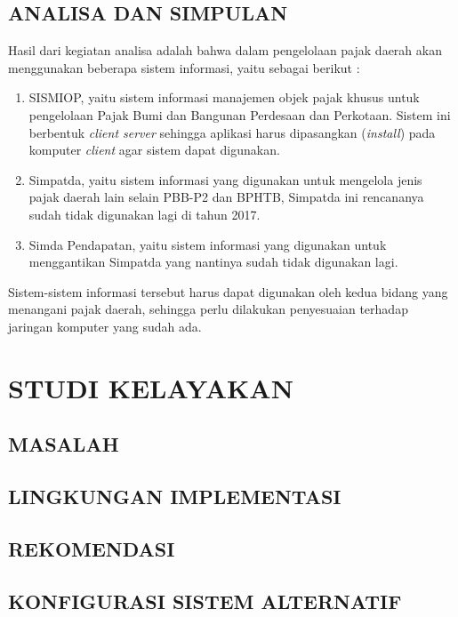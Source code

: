 \documentclass[pdftex,12pt, oneside]{article}
\begin{document}
\subsection{ANALISA DAN SIMPULAN}

Hasil dari kegiatan analisa adalah bahwa dalam pengelolaan pajak daerah akan menggunakan beberapa sistem informasi, yaitu sebagai berikut :

\begin{enumerate}[1.]
  \item SISMIOP, yaitu sistem informasi manajemen objek pajak khusus untuk pengelolaan Pajak Bumi dan Bangunan Perdesaan dan Perkotaan. Sistem ini berbentuk \textit{client server} sehingga aplikasi harus dipasangkan (\textit{install}) pada komputer \textit{client} agar sistem dapat digunakan.
  
  \item Simpatda, yaitu sistem informasi yang digunakan untuk mengelola jenis pajak daerah lain selain PBB-P2 dan BPHTB, Simpatda ini rencananya sudah tidak digunakan lagi di tahun 2017.
  
  \item Simda Pendapatan, yaitu sistem informasi yang digunakan untuk menggantikan Simpatda yang nantinya sudah tidak digunakan lagi.
\end{enumerate}

Sistem-sistem informasi tersebut harus dapat digunakan oleh kedua bidang yang menangani pajak daerah, sehingga perlu dilakukan penyesuaian terhadap jaringan komputer yang sudah ada.

\section{STUDI KELAYAKAN}

\subsection{MASALAH}

\subsection{LINGKUNGAN IMPLEMENTASI}

\subsection{REKOMENDASI}

\subsection{KONFIGURASI SISTEM ALTERNATIF}
\end{document}
